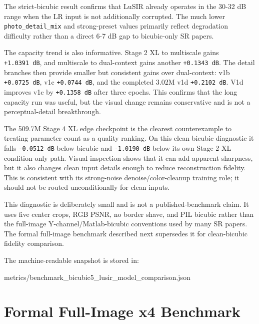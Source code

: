 \documentclass[
  10pt,
]{article}
\newenvironment{Shaded}{}{}
\newcommand{\NormalTok}[1]{#1}
\begin{document}
The strict-bicubic result confirms that LuSIR already operates in the
30-32 dB range when the LR input is not additionally corrupted. The much
lower \texttt{photo\_detail\_mix} and strong-preset values primarily
reflect degradation difficulty rather than a direct 6-7 dB gap to
bicubic-only SR papers.

The capacity trend is also informative. Stage 2 XL to multiscale gains
\texttt{+1.0391\ dB}, and multiscale to dual-context gains another
\texttt{+0.1343\ dB}. The detail branches then provide smaller but
consistent gains over dual-context: v1b \texttt{+0.0725\ dB}, v1c
\texttt{+0.0744\ dB}, and the completed 3.02M v1d \texttt{+0.2102\ dB}.
V1d improves v1c by \texttt{+0.1358\ dB} after three epochs. This
confirms that the long capacity run was useful, but the visual change
remains conservative and is not a perceptual-detail breakthrough.

The 509.7M Stage 4 XL edge checkpoint is the clearest counterexample to
treating parameter count as a quality ranking. On this clean bicubic
diagnostic it falls \texttt{-0.0512\ dB} below bicubic and
\texttt{-1.0190\ dB} below its own Stage 2 XL condition-only path.
Visual inspection shows that it can add apparent sharpness, but it also
changes clean input details enough to reduce reconstruction fidelity.
This is consistent with its strong-noise denoise/color-cleanup training
role; it should not be routed unconditionally for clean inputs.

This diagnostic is deliberately small and is not a published-benchmark
claim. It uses five center crops, RGB PSNR, no border shave, and PIL
bicubic rather than the full-image Y-channel/Matlab-bicubic conventions
used by many SR papers. The formal full-image benchmark described next
supersedes it for clean-bicubic fidelity comparison.

The machine-readable snapshot is stored in:

\begin{Shaded}
\begin{Highlighting}[]
\NormalTok{metrics/benchmark\_bicubic5\_lusir\_model\_comparison.json}
\end{Highlighting}
\end{Shaded}

\hypertarget{formal-full-image-x4-benchmark}{%
\section{Formal Full-Image x4
Benchmark}\label{formal-full-image-x4-benchmark}}
\end{document}

